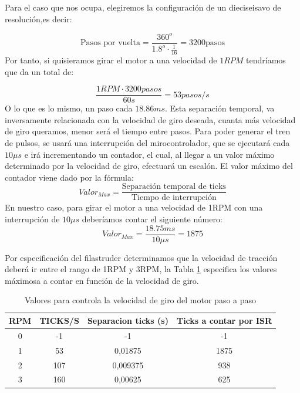 Para el caso que nos ocupa, elegiremos la configuración de un dieciseisavo de resolución,es decir:

\begin{equation}
\text{Pasos por vuelta} = \frac{360^o}{1.8^o \cdot \frac{1}{16} } = 3200 \text{pasos}
\end{equation}
Por tanto, si quisieramos girar el motor a una velocidad de $1RPM$ tendríamos que da un total de:

\begin{equation}
\frac{1 RPM \cdot 3200 pasos}{60 s} = 53 pasos/s
\end{equation}
O lo que es lo mismo, un paso cada $18.86 ms$. Esta separación temporal, va inversamente relacionada con la velocidad de giro deseada, cuanta más velocidad de giro queramos, menor será el tiempo entre pasos. Para poder generar el tren de pulsos, se usará una interrupción del mirocontrolador, que se ejecutará cada $10\mu s$ e irá incrementando un contador, el cual, al llegar a un valor máximo determinado por la velocidad de giro, efectuará un escalón. El valor máximo del contador viene dado por la fórmula:
\begin{equation}
 Valor_{Max} = \frac{\text{Separación temporal de ticks}}{\text{Tiempo de interrupción}}
\end{equation}
En nuestro caso, para girar el motor a una velocidad de 1RPM con una interrupción de $10\mu s$ deberíamos contar el siguiente número:
\begin{equation}
Valor_{Max} = \frac{18.75 ms}{10\mu s} = 1875
\end{equation}

Por especificación del filastruder determinamos que la velocidad de tracción deberá ir entre el rango de 1RPM y 3RPM, la Tabla \ref{tab:valores_paso_paso} especifica los valores máximosa a contar en función de la velocidad de giro.

\begin{table}[H]
    \centering
    \begin{tabular}{cccc}
        \multicolumn{1}{l}{{\bf RPM}} & \multicolumn{1}{l}{{\bf TICKS/S}} & \multicolumn{1}{l}{{\bf Separacion ticks (s)}} & \multicolumn{1}{l}{{\bf Ticks a contar por ISR}} \\
        \hline
        0 & -1 & -1 & -1 \\
        1 & 53 & 0,01875 & 1875 \\
        2 & 107 & 0,009375 & 938 \\
        3 & 160 & 0,00625 & 625
    \end{tabular}
    \caption{Valores para controla la velocidad de giro del motor paso a paso}
    \label{tab:valores_paso_paso}
\end{table}

